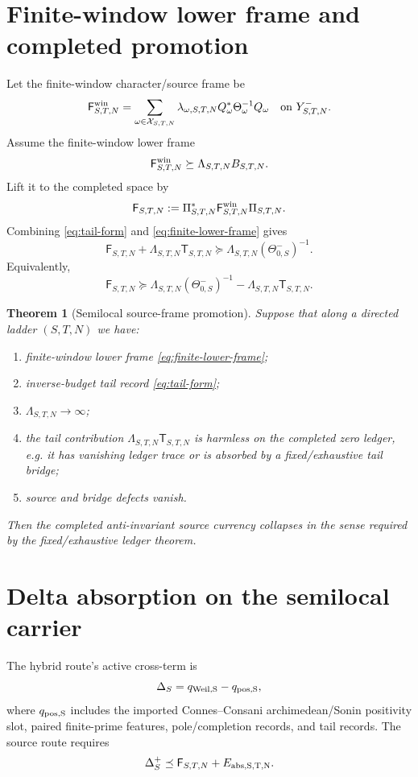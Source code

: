 \documentclass[11pt]{article}
\newtheorem{theorem}{Theorem}
\newcommand{\Y}{Y}
\newcommand{\F}{\mathsf F}
\newcommand{\Ttail}{\mathsf T}
\begin{document}
\section{Finite-window lower frame and completed promotion}
Let the finite-window character/source frame be
\[
  \F^{\rm win}_{S,T,N}
  =\sum_{\omega\in\mathcal X_{S,T,N}}
  \lambda_{\omega,S,T,N}Q_{\omega}^{*}\Theta_{\omega}^{-1}Q_{\omega}
  \quad\text{on }\Y_{S,T,N}^-.
\]
Assume the finite-window lower frame
\begin{equation}\label{eq:finite-lower-frame}
  \F^{\rm win}_{S,T,N}\succeq \Lambda_{S,T,N}B_{S,T,N}.
\end{equation}
Lift it to the completed space by
\[
  \F_{S,T,N}:=\Pi_{S,T,N}^{*}\F^{\rm win}_{S,T,N}\Pi_{S,T,N}.
\]
Combining \eqref{eq:tail-form} and \eqref{eq:finite-lower-frame} gives
\begin{equation}\label{eq:completed-lower-frame-up-to-tail}
  \F_{S,T,N}+\Lambda_{S,T,N}\Ttail_{S,T,N}
  \succeq
  \Lambda_{S,T,N}(\Theta_{0,S}^-)^{-1}.
\end{equation}
Equivalently,
\[
  \F_{S,T,N}
  \succeq
  \Lambda_{S,T,N}(\Theta_{0,S}^-)^{-1}
  -\Lambda_{S,T,N}\Ttail_{S,T,N}.
\]

\begin{theorem}[Semilocal source-frame promotion]
Suppose that along a directed ladder $(S,T,N)$ we have:
\begin{enumerate}[label=(\alph*)]
\item finite-window lower frame \eqref{eq:finite-lower-frame};
\item inverse-budget tail record \eqref{eq:tail-form};
\item $\Lambda_{S,T,N}\to\infty$;
\item the tail contribution $\Lambda_{S,T,N}\Ttail_{S,T,N}$ is harmless on the completed zero ledger, e.g. it has vanishing ledger trace or is absorbed by a fixed/exhaustive tail bridge;
\item source and bridge defects vanish.
\end{enumerate}
Then the completed anti-invariant source currency collapses in the sense required by the fixed/exhaustive ledger theorem.
\end{theorem}

\section{Delta absorption on the semilocal carrier}
The hybrid route's active cross-term is
\[
  \Delta_S=q_{\rm Weil,S}-q_{\rm pos,S},
\]
where $q_{\rm pos,S}$ includes the imported Connes--Consani archimedean/Sonin positivity slot, paired finite-prime features, pole/completion records, and tail records.  The source route requires
\begin{equation}\label{eq:delta-absorb}
  \Delta_S^+\preceq \F_{S,T,N}+E_{\rm abs,S,T,N}.
\end{equation}
\end{document}
